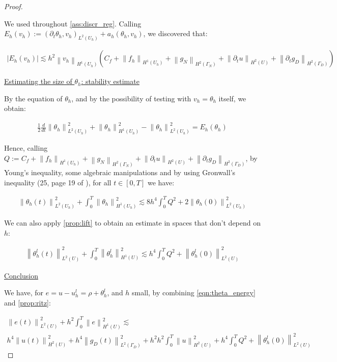 \documentclass[english,a4paper,10pt,oneside]{scrbook}	%
\theoremstyle{break}
\newenvironment{mproof}[1][\proofname]{%
  \begin{proof}[#1]$ $\par\nobreak\ignorespaces
}{%
  \end{proof}
}
\renewcommand*{\proofname}{Proof}
\theoremstyle{remark}
\newcommand{\norm}[1]{\left\lVert#1\right\rVert}
\begin{document}
\begin{appendices}
\begin{mproof}
We used throughout \cref{ass:discr_reg}.
Calling $E_h(v_h):=(\partial_t \theta_h , v_h)_{L^2(U_h)} + a_h(\theta_h, v_h)$, we discovered that:

\begin{align}
\label{eqn:theta_residual}
	|E_h(v_h)|\lesssim h^2 \norm{v_h}_{H^1(U_h)} (C_f + \norm{f_h}_{H^1(U_h)} + \norm{g_N}_{H^2(\Gamma_N)} + \norm{\partial_t u}_{H^2(U)} + \norm{\partial_t g_D}_{H^2(\Gamma_D)} )
\end{align}

\underline{Estimating the size of $\theta_h$: stability estimate}

By the equation of $\theta_h$, and by the possibility of testing with $v_h = \theta_h$ itself, we obtain:

\begin{align*}
	\frac{1}{2} \frac{d}{dt} \norm{\theta_h}_{L^2(U_h)}^2 + \norm{\theta_h}^2_{H^1(U_h)} - \norm{\theta_h}^2_{L^2(U_h)} = E_h(\theta_h)
\end{align*}

Hence, calling  $Q:=C_f + \norm{f_h}_{H^1(U_h)} + \norm{g_N}_{H^2(\Gamma_N)} + \norm{\partial_t u}_{H^2(U)} + \norm{\partial_t g_D}_{H^2(\Gamma_D)}$, by Young's inequality, some algebraic manipulations and by using Gronwall's inequality (25, page 19 of \cite{gilardi}), for all $t \in [0,T]$ we have:

\begin{align}
\label{eqn:theta_energy}
	\norm{\theta_h(t)}_{L^2(U_h)}^2 + \int_0^T\norm{\theta_h}^2_{H^1(U_h)} \lesssim 8h^4\int_0^T Q^2 + 2\norm{\theta_h(0)}_{L^2(U_h)}^2
\end{align}

We can also apply \cref{prop:lift} to obtain an estimate in spaces that don't depend on $h$:


\begin{align*}
	\norm{\theta_h^l(t)}_{L^2(U)}^2 + \int_0^T\norm{\theta_h^l}^2_{H^1(U)} \lesssim h^4\int_0^T Q^2 + \norm{\theta_h^l(0)}_{L^2(U)}^2
\end{align*}

\underline{Conclusion}

We have, for $e=u-u_h^l = \rho + \theta_h^l$, and $h$ small, by combining \cref{eqn:theta_energy} and \cref{prop:ritz}:

\begin{align*}
	\norm{e(t)}_{L^2(U)}^2 + h^2\int_0^T\norm{e}^2_{H^1(U)} \lesssim \\
	 h^4 \norm{u(t)}_{H^2(U)}^2 + h^4\norm{g_D(t)}_{L^2(\Gamma_D)}^2 + h^2h^2\int_0^T\norm{u}^2_{H^2(U)} +  h^4\int_0^T Q^2 + \norm{\theta_h^l(0)}_{L^2(U)}^2
\end{align*}


\end{mproof}
\end{appendices}
\end{document}
